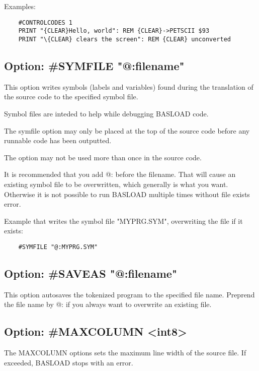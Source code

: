 \documentclass{article}
\begin{document}
        Examples:

    \begin{verbatim}
    #CONTROLCODES 1
    PRINT "{CLEAR}Hello, world": REM {CLEAR}->PETSCII $93
    PRINT "\{CLEAR} clears the screen": REM {CLEAR} unconverted
    \end{verbatim}

    \subsection{Option: \#SYMFILE "@:filename"}

        This option writes symbols (labels and variables) found during the
        translation of the source code to the specified
        symbol file.

        Symbol files are inteded to help while debugging BASLOAD code.
    
        The symfile option may only be placed at the top of
        the source code before any runnable code has
        been outputted.

        The option may not be used more than once in the source code.

        It is recommended that you add @: before the filename. That will cause
        an existing symbol file to be overwritten, which generally is what you
        want. Otherwise it is not possible to run BASLOAD multiple times
        without file exists error.

        Example that writes the symbol file "MYPRG.SYM", overwriting the
        file if it exists:
        \begin{verbatim}
    #SYMFILE "@:MYPRG.SYM"
        \end{verbatim}

    \subsection{Option: \#SAVEAS "@:filename"}
        
        This option autosaves the tokenized program to the
        specified file name. Preprend the file name by
        @: if you always want to overwrite an existing file.

    \subsection{Option: \#MAXCOLUMN \textless int8\textgreater}
    
        The MAXCOLUMN options sets the maximum line width
        of the source file. If exceeded, BASLOAD stops with an
        error.
\end{document}
